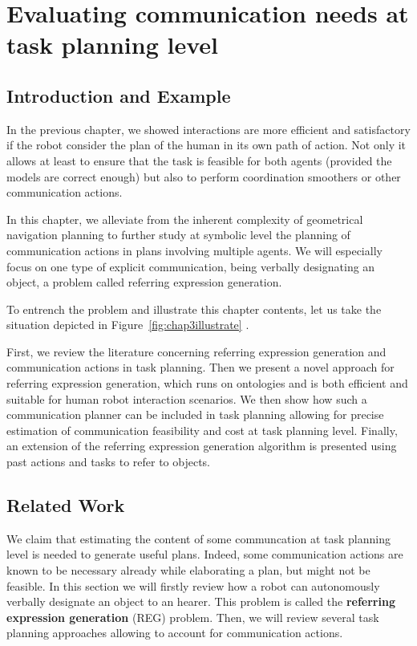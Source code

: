 \documentclass[a4paper,11pt,twoside]{StyleThese}
\begin{document}
\setcounter{chapter}{2} %
\dominitoc
\faketableofcontents
\fi

\chapter{Evaluating communication needs at task planning level}
\minitoc
\printnomenclature

\section{Introduction and Example}
In the previous chapter, we showed interactions are more efficient and satisfactory if the robot consider the plan of the human in its own path of action. Not only it allows at least to ensure that the task is feasible for both agents (provided the models are correct enough) but also to perform coordination smoothers or other communication actions.

In this chapter, we alleviate from the inherent complexity of geometrical navigation planning to further study at symbolic level the planning of communication actions in plans involving multiple agents. We will especially focus on one type of explicit communication, being verbally designating an object, a problem called referring expression generation.

To entrench the problem and illustrate this chapter contents, let us take the situation depicted in Figure~\ref{fig:chap3illustrate} .  

First, we review the literature concerning referring expression generation and communication actions in task planning. Then we present a novel approach for referring expression generation, which runs on ontologies and is both efficient and suitable for human robot interaction scenarios. We then show how such a communication planner can be included in task planning allowing for precise estimation of communication feasibility and cost at task planning level. Finally, an extension of the referring expression generation algorithm is presented using past actions and tasks to refer to objects.

\section{Related Work}
We claim that estimating the content of some communcation at task planning level is needed to generate useful plans. Indeed, some communication actions are known to be necessary already while elaborating a plan, but might not be feasible.
In this section we will firstly review how a robot can autonomously verbally designate an object to an hearer. This problem is called the \textbf{referring expression generation} (REG) problem.
Then, we will review several task planning approaches allowing to account for communication actions.
\end{document}
